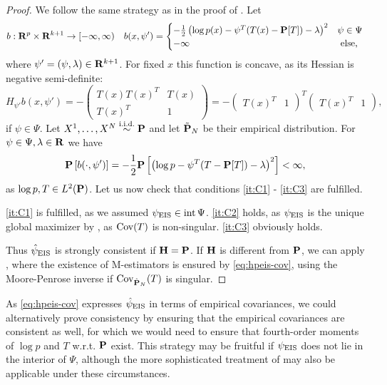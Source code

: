 \begin{proof}
    We follow the same strategy as in the proof of . Let 
    \begin{align*}
        b: \R^{p} \times \R^{k + 1} \to [-\infty, \infty)  && b(x,\psi') = \begin{cases}
            -\frac{1}{2} \left( \log p(x) - \psi^{T}(T(x) - \P [T]) - \lambda \right)^{2} & \psi \in \Psi \\
            -\infty &  \text{ else,}
        \end{cases}
    \end{align*}
    where $\psi' = (\psi, \lambda) \in \R^{k + 1}$. For fixed $x$ this function is concave, as its Hessian is negative semi-definite:
    $$
        H_{\psi'} b(x, \psi') = -\begin{pmatrix}
            T(x)T(x)^{T} & T(x) \\
            T(x)^{T} &  1
        \end{pmatrix} = -\begin{pmatrix} T(x)^{T} & 1 \end{pmatrix}^{T} \begin{pmatrix} T(x)^{T}& 1 \end{pmatrix},
    $$
    if $\psi \in \Psi$. Let $X^{1}, \dots, X^{N} \iid \P$ and let $\tilde \P _{N}$ be their empirical distribution. For $\psi \in \Psi, \lambda \in \R$ we have 
    $$
        \P \left[ b(\cdot, \psi') \right] = - \frac{1}{2} \P \left[ \left( \log p - \psi^{T}(T - \P[T]) - \lambda\right)^{2} \right] < \infty,
    $$
    as $\log p, T\in L^{2}(\P)$. Let us now check that conditions \ref{it:C1} - \ref{it:C3} are fulfilled. 

    \ref{it:C1} is fulfilled, as we assumed $\peis \in \operatorname{int} \Psi$. \ref{it:C2} holds, as $\peis$ is the unique global maximizer by , as $\cov (T)$ is non-singular.
    \ref{it:C3} obviously holds. 

    Thus $\hpeis$ is strongly consistent if $\H = \P$. If $\H$ is different from $\P$, we can apply , where the existence of M-estimators is ensured by \eqref{eq:hpeis-cov}, using the Moore-Penrose inverse if $\cov_{\hat\P_{N}}(T)$ is singular. 
\end{proof}

As \eqref{eq:hpeis-cov} expresses $\hpeis$ in terms of empirical covariances, we could alternatively prove consistency by ensuring that the empirical covariances are consistent as well, for which we would need to ensure that fourth-order moments of $\log p$ and $T$ w.r.t. $\P$ exist. This strategy may be fruitful if $\peis$ does not lie in the interior of $\Psi$, although the more sophisticated treatment of \citep{Haberman1989Concavity} may also be applicable under these circumstances.

